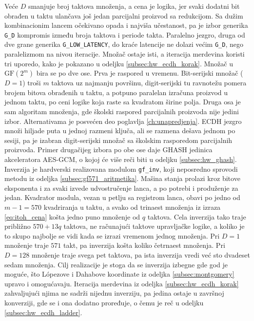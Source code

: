 Veće $D$ smanjuje broj taktova množenja, a cena je logika, jer svaki dodatni bit obrađen u taktu ulančava još jedan parcijalni proizvod sa redukcijom. Sa dužim kombinacionim lancem očekivano opada i najviša učestanost, pa je izbor generika \texttt{G\_D} kompromis između broja taktova i periode takta. Paralelno jezgro, druga od dve grane generika \texttt{G\_LOW\_LATENCY}, do kraće latencije ne dolazi većim \texttt{G\_D}, nego paralelizmom na nivou iteracije. Množač ostaje isti, a iteracija merdevina koristi tri uporedo, kako je pokazano u odeljku \ref{subsec:hw_ecdh_korak}.
\smallbreak
Množač u $\mathrm{GF}(2^m)$ bira se po dve ose. Prva je raspored u vremenu. Bit-serijski množač ($D = 1$) troši $m$ taktova uz najmanju površinu, digit-serijski tu ravnotežu pomera brojem bitova obrađenih u taktu, a potpuno paralelan izračuna proizvod u jednom taktu, po ceni logike koja raste sa kvadratom širine polja. Druga osa je sam algoritam množenja, gde školski raspored parcijalnih proizvoda nije jedini izbor. Alternativama je posvećen deo poglavlja \ref{ch:unapredjenja}. ECDH jezgro množi hiljade puta u jednoj razmeni ključa, ali se razmena dešava jednom po sesiji, pa je izabran digit-serijski množač sa školskim rasporedom parcijalnih proizvoda. Primer drugačijeg izbora po obe ose daje GHASH jedinica akceleratora AES-GCM, o kojoj će više reči biti u odeljku \ref{subsec:hw_ghash}.
\smallbreak
Inverzija je hardverski realizovana modulom \texttt{gf\_inv}, koji neposredno sprovodi metodu iz odeljka \ref{subsec:gf571_aritmetika}. Mašina stanja prolazi kroz bitove eksponenta i za svaki izvede udvostručenje lanca, a po potrebi i produženje za jedan. Kvadrator modula, vezan u petlju sa registrom lanca, obavi po jedno od $m - 1 = 570$ kvadriranja u taktu, a svako od trinaest množenja iz izraza \eqref{eq:itoh_cena} košta jedno puno množenje od $q$ taktova. Cela inverzija tako traje približno $570 + 13q$ taktova, ne računajući taktove upravljačke logike, a koliko je to skupo najbolje se vidi kada se izrazi vremenom jednog množenja. Pri $D = 1$ množenje traje $571$ takt, pa inverzija košta koliko četrnaest množenja. Pri $D = 128$ množenje traje svega pet taktova, pa ista inverzija vredi već sto dvadeset sedam množenja. Cilj realizacije je stoga da se inverzija izbegne gde god je moguće, što Lópezove i Dahabove koordinate iz odeljka \ref{subsec:montgomery} upravo i omogućavaju. Iteracija merdevina iz odeljka \ref{subsec:hw_ecdh_korak} zahvaljujući njima ne sadrži nijednu inverziju, pa jedina ostaje u završnoj konverziji, gde se i ona dodatno proređuje, o čemu je reč u odeljku \ref{subsec:hw_ecdh_ladder}.

